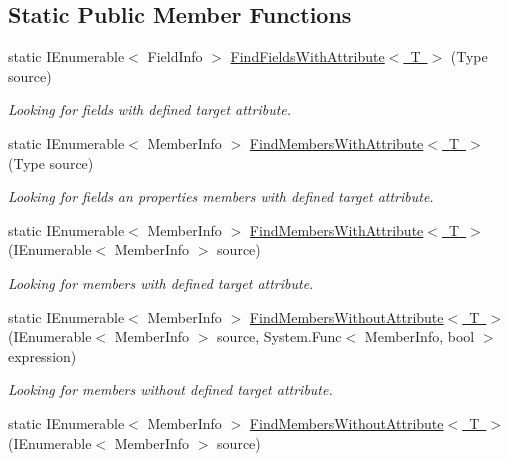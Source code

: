 \subsection*{Static Public Member Functions}
\begin{DoxyCompactItemize}
\item 
static I\+Enumerable$<$ Field\+Info $>$ \mbox{\hyperlink{class_uniform_data_operator_1_1_assemblies_management_1_1_members_handler_a563f793ce990d95b0830a3dff609a9ee}{Find\+Fields\+With\+Attribute$<$ T $>$}} (Type source)
\begin{DoxyCompactList}\small\item\em Looking for fields with defined target attribute. \end{DoxyCompactList}\item 
static I\+Enumerable$<$ Member\+Info $>$ \mbox{\hyperlink{class_uniform_data_operator_1_1_assemblies_management_1_1_members_handler_abf58fa664b9202a0776cbb9a1c659ba9}{Find\+Members\+With\+Attribute$<$ T $>$}} (Type source)
\begin{DoxyCompactList}\small\item\em Looking for fields an properties members with defined target attribute. \end{DoxyCompactList}\item 
static I\+Enumerable$<$ Member\+Info $>$ \mbox{\hyperlink{class_uniform_data_operator_1_1_assemblies_management_1_1_members_handler_ad5add0d63eb8e0f8dac0e48be98032ae}{Find\+Members\+With\+Attribute$<$ T $>$}} (I\+Enumerable$<$ Member\+Info $>$ source)
\begin{DoxyCompactList}\small\item\em Looking for members with defined target attribute. \end{DoxyCompactList}\item 
static I\+Enumerable$<$ Member\+Info $>$ \mbox{\hyperlink{class_uniform_data_operator_1_1_assemblies_management_1_1_members_handler_a1c637a7411bf34126f5ab90b130a3f04}{Find\+Members\+Without\+Attribute$<$ T $>$}} (I\+Enumerable$<$ Member\+Info $>$ source, System.\+Func$<$ Member\+Info, bool $>$ expression)
\begin{DoxyCompactList}\small\item\em Looking for members without defined target attribute. \end{DoxyCompactList}\item 
static I\+Enumerable$<$ Member\+Info $>$ \mbox{\hyperlink{class_uniform_data_operator_1_1_assemblies_management_1_1_members_handler_a5c40c81b34d93d301c5f0d421dadc39a}{Find\+Members\+Without\+Attribute$<$ T $>$}} (I\+Enumerable$<$ Member\+Info $>$ source)

\end{DoxyCompactItemize}
